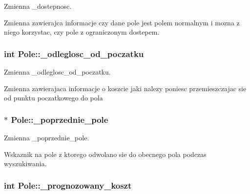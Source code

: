 Zmienna \+\_\+dostepnosc. 

Zmienna zawierajca informacje czy dane pole jest polem normalnym i mozna z niego korzystac, czy pole z ograniczonym dostepem. \hypertarget{class_pole_a57fd443aaf2f438db4a136b94dfcb586}{
\subsubsection[{\+\_\+odleglosc\+\_\+od\+\_\+poczatku}]{\setlength{\rightskip}{0pt plus 5cm}int Pole\+::\+\_\+odleglosc\+\_\+od\+\_\+poczatku\hspace{0.3cm}{\ttfamily [private]}}}\label{class_pole_a57fd443aaf2f438db4a136b94dfcb586}


Zmienna \+\_\+odleglosc\+\_\+od\+\_\+poczatku. 

Zmienna zawierajaca informacje o koszcie jaki nalezy poniesc przemieszczajac sie od punktu poczatkowego do pola \hypertarget{class_pole_ad2e0e70c96c56f297696948c98d1d862}{
\subsubsection[{\+\_\+poprzednie\+\_\+pole}]{$\ast$ Pole\+::\+\_\+poprzednie\+\_\+pole\hspace{0.3cm}{\ttfamily [private]}}}\label{class_pole_ad2e0e70c96c56f297696948c98d1d862}


Zmienna \+\_\+poprzednie\+\_\+pole. 

Wskaznik na pole z ktorego odwolano sie do obecnego pola podczas wyszukiwania. \hypertarget{class_pole_abb85b44ef47a160b5a82bdd25e691a6e}{
\subsubsection[{\+\_\+prognozowany\+\_\+koszt}]{\setlength{\rightskip}{0pt plus 5cm}int Pole\+::\+\_\+prognozowany\+\_\+koszt\hspace{0.3cm}{\ttfamily [private]}}}\label{class_pole_abb85b44ef47a160b5a82bdd25e691a6e}


